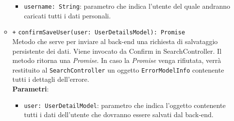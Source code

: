 \begin{itemize}
\begin{itemize}
		\begin{itemize}
			\item \texttt{username: String}: parametro che indica l'utente del quale andranno caricati tutti i dati personali.
		\end{itemize}
		\item \texttt{+} \texttt{confirmSaveUser(user: UserDetailsModel): Promise} \\Metodo che serve per inviare al back-end una richiesta di salvataggio persistente dei dati. Viene invocato da Confirm in SearchController. Il metodo ritorna una \textit{Promise}. In caso la \textit{Promise} venga rifiutata, verrà restituito al \texttt{SearchController} un oggetto \texttt{ErrorModelInfo} contenente tutti i dettagli dell'errore. \\
		\textbf{Parametri}:
		\begin{itemize}
			\item \texttt{user: UserDetailModel}: parametro che indica l'oggetto contenente tutti i dati dell'utente che dovranno essere salvati dal back-end.
		\end{itemize}
	
	\end{itemize}
\end{itemize}
